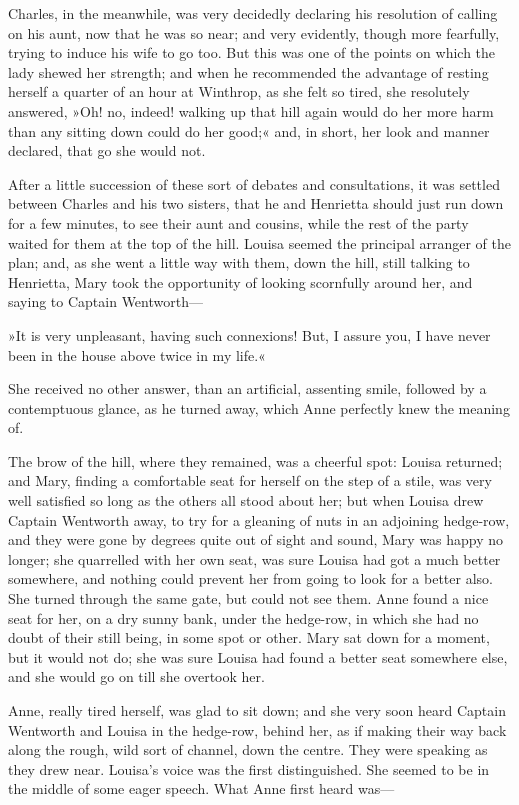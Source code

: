 Charles, in the meanwhile, was very decidedly declaring his resolution of calling on his aunt, now that he was so near; and very evidently, though more fearfully, trying to induce his wife to go too. But this was one of the points on which the lady shewed her strength; and when he recommended the advantage of resting herself a quarter of an hour at Winthrop, as she felt so tired, she resolutely answered, »Oh! no, indeed! walking up that hill again would do her more harm than any sitting down could do her good;« and, in short, her look and manner declared, that go she would not.

After a little succession of these sort of debates and consultations, it was settled between Charles and his two sisters, that he and Henrietta should just run down for a few minutes, to see their aunt and cousins, while the rest of the party waited for them at the top of the hill. Louisa seemed the principal arranger of the plan; and, as she went a little way with them, down the hill, still talking to Henrietta, Mary took the opportunity of looking scornfully around her, and saying to Captain Wentworth—

»It is very unpleasant, having such connexions! But, I assure you, I have never been in the house above twice in my life.«

She received no other answer, than an artificial, assenting smile, followed by a contemptuous glance, as he turned away, which Anne perfectly knew the meaning of.

The brow of the hill, where they remained, was a cheerful spot: Louisa returned; and Mary, finding a comfortable seat for herself on the step of a stile, was very well satisfied so long as the others all stood about her; but when Louisa drew Captain Wentworth away, to try for a gleaning of nuts in an adjoining hedge-row, and they were gone by degrees quite out of sight and sound, Mary was happy no longer; she quarrelled with her own seat, was sure Louisa had got a much better somewhere, and nothing could prevent her from going to look for a better also. She turned through the same gate, but could not see them. Anne found a nice seat for her, on a dry sunny bank, under the hedge-row, in which she had no doubt of their still being, in some spot or other. Mary sat down for a moment, but it would not do; she was sure Louisa had found a better seat somewhere else, and she would go on till she overtook her.

Anne, really tired herself, was glad to sit down; and she very soon heard Captain Wentworth and Louisa in the hedge-row, behind her, as if making their way back along the rough, wild sort of channel, down the centre. They were speaking as they drew near. Louisa's voice was the first distinguished. She seemed to be in the middle of some eager speech. What Anne first heard was—

